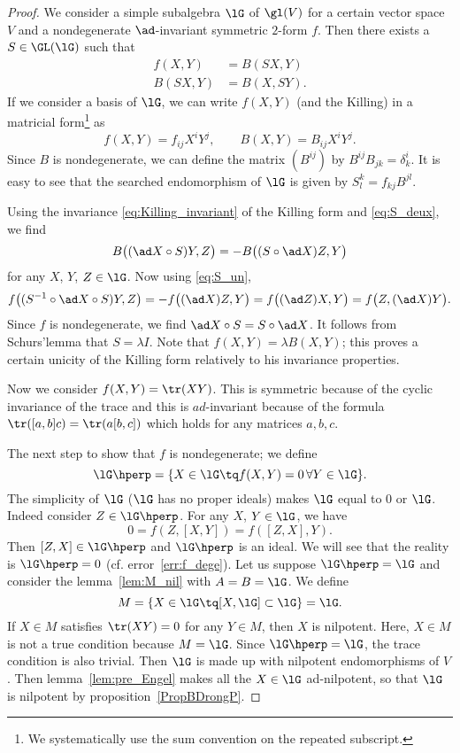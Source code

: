 \begin{proof}
	We consider a simple subalgebra $\lG$ of $\gl(V)$ for a certain vector space $V$ and a nondegenerate $\ad$-invariant symmetric $2$-form $f$. Then there exists a $S\in\GL(\lG)$ such that
	\begin{subequations}
		\begin{align}
			f(X,Y)  & =B(SX,Y) \label{eq:S_un}     \\
			B(SX,Y) & =B(X,SY).  \label{eq:S_deux}
		\end{align}
	\end{subequations}
	If we consider a basis of $\lG$, we can write $f(X,Y)$ (and the Killing) in a matricial form\footnote{We systematically use the sum convention on the repeated subscript.} as
	\[
		f(X,Y)=f_{ij}X^iY^j,\qquad B(X,Y)=B_{ij}X^iY^j.
	\]
	Since $B$ is nondegenerate, we can define the matrix $(B^{ij})$ by $B^{ij}B_{jk}=\delta^i_k$. It is easy to see that the searched endomorphism of $\lG$ is given by $S^k_l=f_{kj}B^{jl}$.

	Using the invariance \eqref{eq:Killing_invariant} of the Killing form and \eqref{eq:S_deux}, we find
	\[
		B\big( (\ad X\circ S)Y,Z  \big)=-B\big( (S\circ\ad X)Z,Y  \big)
	\]
	for any $X$, $Y$, $Z\in\lG$. Now using \eqref{eq:S_un},
	\begin{equation}
		f\big(  (S^{-1}\circ\ad X\circ S)Y,Z  \big)=-f\big((\ad X) Z,Y\big)
		=f\big( (\ad Z) X,Y \big)
		=f\big( Z, (\ad X)Y \big).
	\end{equation}
	Since $f$ is nondegenerate, we find $\ad X\circ S=S\circ\ad X$. It follows from Schurs'lemma that $S=\lambda I$. Note that $f(X,Y)=\lambda B(X,Y)$; this proves a certain unicity of the Killing form relatively to his invariance properties.

	Now we consider $f(X,Y)=\tr(XY)$. This is symmetric because of the cyclic invariance of the trace and this is $ad$-invariant because of the formula $\tr([a,b]c)=\tr(a[b,c])$ which holds for any matrices $a,b,c$.

	The next step to show that $f$ is nondegenerate; we define
	\[
		\lG\hperp=\{X\in\lG\tq f(X,Y)=0\,\forall Y\in\lG   \}.
	\]
	The simplicity of $\lG$ ($\lG$ has no proper ideals) makes $\lG$ equal to $0$ or $\lG$. Indeed consider $Z\in\lG\hperp$. For any $X$, $Y\in\lG$, we have
	\[
		0=f(Z,[X,Y])=f([Z,X],Y).
	\]
	Then $[Z,X]\in\lG\hperp$ and $\lG\hperp$ is an ideal. We will see that the reality is $\lG\hperp=0$ (cf. error~\ref{err:f_dege}). Let us suppose $\lG\hperp=\lG$ and consider the lemma~\ref{lem:M_nil} with $A=B=\lG$. We define
	\[
		M=\{ X\in\lG\tq [X,\lG]\subset\lG \}=\lG.
	\]
	If $X\in M$ satisfies $\tr(XY)=0$ for any $Y\in M$, then $X$ is nilpotent. Here, $X\in M$ is not a true condition because $M=\lG$. Since $\lG\hperp=\lG$, the trace condition is also trivial. Then $\lG$ is made up with nilpotent endomorphisms of $V$. Then lemma~\ref{lem:pre_Engel} makes all the $X\in\lG$ ad-nilpotent, so that $\lG$ is nilpotent by proposition~\ref{PropBDrongP}.


\end{proof}
